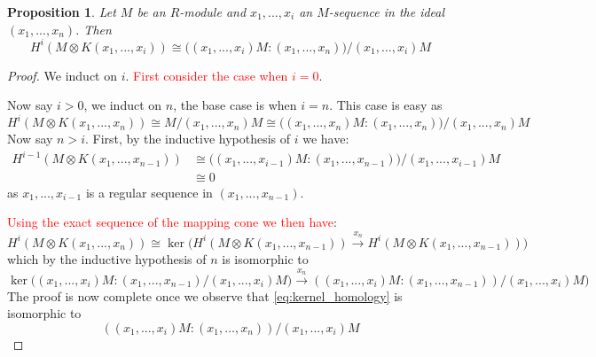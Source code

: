 \documentclass[12pt]{article}
\theoremstyle{plain}
\newtheorem{proposition}[thm]{Proposition}
\theoremstyle{definition}
\newcommand{\lto}{\longrightarrow}
\begin{document}
\begin{proposition}
Let $M$ be an $R$-module and $x_1,...,x_i$ an $M$-sequence in the ideal $(x_1,...,x_n)$. Then
\begin{equation}
H^i(M \otimes K(x_1,...,x_i)) \cong \big((x_1,...,x_i)M : (x_1,...,x_n)\big)/(x_1,...,x_i)M
\end{equation}
\end{proposition}
\begin{proof}
We induct on $i$. \textcolor{red}{First consider the case when $i = 0$}.

Now say $i > 0$, we induct on $n$, the base case is when $i = n$. This case is easy as
\begin{equation}
H^i(M \otimes K(x_1,...,x_n)) \cong M/(x_1,...,x_n)M \cong \big((x_1,...,x_n)M : (x_1,...,x_n)\big)/(x_1,...,x_n)M
\end{equation}
Now say $n > i$. First, by the inductive hypothesis of $i$ we have:
\begin{align*}
H^{i-1}(M \otimes K(x_1,...,x_{n-1})) &\cong \big((x_1,...,x_{i-1})M : (x_1,...,x_{n-1})\big)/(x_1,...,x_{i-1})M\\
&\cong 0
\end{align*}
as $x_1,...,x_{i-1}$ is a regular sequence in $(x_1,...,x_{n-1})$.

\textcolor{red}{Using the exact sequence of the mapping cone we then have}:
\begin{equation}
H^i(M \otimes K(x_1,...,x_n)) \cong \operatorname{ker}\big(H^{i}(M \otimes K(x_1,...,x_{n-1})) \stackrel{x_n}{\lto} H^i(M \otimes K(x_1,...,x_{n-1}))\big)
\end{equation}
which by the inductive hypothesis of $n$ is isomorphic to
\begin{equation}\label{eq:kernel_homology}
\operatorname{ker}\big((x_1,...,x_i)M : (x_1,...,x_{n-1})/(x_1,...,x_i)M) \stackrel{x_n}{\lto} ((x_1,...,x_i)M : (x_1,...,x_{n-1}))/(x_1,...,x_i)M\big)
\end{equation}
The proof is now complete once we observe that \eqref{eq:kernel_homology} is isomorphic to
\begin{equation}
((x_1,...,x_i)M : (x_1,...,x_n))/(x_1,...,x_i)M
\end{equation}
\end{proof}
\end{document}
